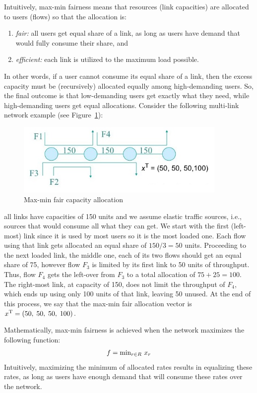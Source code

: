 \documentclass{article}
\begin{document}
Intuitively, max-min fairness means that  resources (link capacities) are allocated to users (flows) so that
the allocation is: 
\begin{enumerate}
\item {\em fair:} all users get equal share of a link, as long as users have demand that would fully consume their share, and
\item {\em efficient:} each link is utilized to the maximum load possible.
\end{enumerate}
In other words, if a user cannot consume its equal share of a link, then the excess capacity must be (recursively) allocated equally among high-demanding users. So, the final outcome is that low-demanding users get exactly what they need, while high-demanding users get equal allocations. Consider the following multi-link network example 
(see Figure~\ref{fig:max-min-alloc}):
\begin{figure}[htbp] %
   \centering
   \includegraphics[width=4in]{figures/max-min-fair.jpg} 
   \caption{Max-min fair capacity allocation}
   \label{fig:max-min-alloc}
\end{figure}
all links have capacities of 150 units and we assume elastic traffic sources, i.e., sources that would consume all what they can get. We start with the first (left-most) link since it is used by most users so it is the most loaded one. Each flow using that link gets allocated an equal share of $150/3=50$ units. Proceeding to the next loaded link, the middle one, each of its two flows should get an equal share of 75, however flow $F_3$ is limited by its first link to 50 units of throughput. Thus, flow $F_4$ gets the left-over from $F_3$ to a total allocation of $75+25=100$. The right-most link, at capacity of 150, does not limit the throughput  of $F_4$, which ends up using only 100 units of that link, leaving 50 unused. At the end of this process, we say that the max-min fair allocation  vector is $x^{\rm T} =(50,\; 50,\; 50,\; 100)$.

Mathematically, max-min fairness is achieved when the network maximizes the following function:
\begin{eqnarray*}
f = {\rm min}_{r \in R} \ x_r
\end{eqnarray*}
Intuitively, maximizing the minimum of allocated rates results in equalizing these rates, as long as users have enough demand that will consume these rates over the network.
\end{document}

